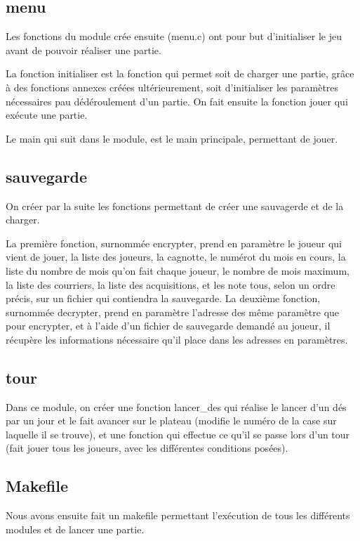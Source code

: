 \documentclass[a4paper, 11pt]{report}
\begin{document}
\subsection{menu}
Les fonctions du module crée ensuite (menu.c) ont pour but d'initialiser le jeu avant de pouvoir réaliser une partie.

La fonction initialiser est la fonction qui permet soit de charger une partie, grâce à des fonctions annexes créées ultérieurement, soit d'initialiser les paramètres nécessaires pau dédéroulement d'un partie.
On fait ensuite la fonction jouer qui exécute une partie.

Le main qui suit dans le module, est le main principale, permettant de jouer.

\subsection{sauvegarde}
On créer par la suite les fonctions permettant de créer une sauvagerde et de la charger.

La première fonction, surnommée encrypter, prend en paramètre le joueur qui vient de jouer, la liste des joueurs, la cagnotte, le numérot du mois en cours, la liste du nombre de mois qu'on fait chaque joueur, le nombre de mois maximum, la liste des courriers, la liste des acquisitions, et les note tous, selon un ordre précis, sur un fichier qui contiendra la sauvegarde.
La deuxième fonction, surnommée decrypter, prend en paramètre l'adresse des même paramètre que pour encrypter, et à l'aide d'un fichier de sauvegarde demandé au joueur, il récupère les informations nécessaire qu'il place dans les adresses en paramètres.


\subsection{tour}
Dans ce module, on créer une fonction lancer\_des qui réalise le lancer d'un dés par un jour et le fait avancer sur le plateau (modifie le numéro de la case sur laquelle il se trouve), et une fonction qui effectue ce qu'il se passe lors d'un tour (fait jouer tous les joueurs, avec les différentes conditions posées).

\subsection{Makefile}
Nous avons ensuite fait un makefile permettant l'exécution de tous les différents modules et de lancer une partie.
\end{document}

